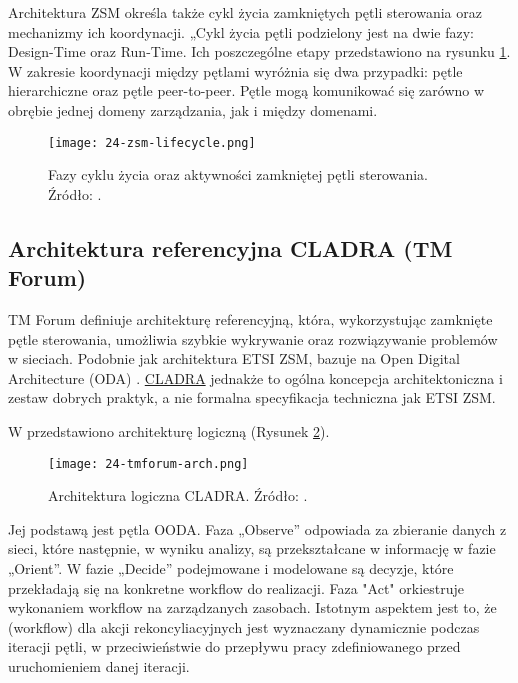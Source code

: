 Architektura ZSM określa także cykl życia zamkniętych pętli sterowania oraz mechanizmy ich koordynacji. „Cykl życia pętli podzielony jest na dwie fazy: Design-Time oraz Run-Time. Ich poszczególne etapy przedstawiono na rysunku \ref{fig:24-zsm-lifecycle}. W zakresie koordynacji między pętlami wyróżnia się dwa przypadki: pętle hierarchiczne oraz pętle peer-to-peer. Pętle mogą komunikować się zarówno w obrębie jednej domeny zarządzania, jak i między domenami.

\begin{figure}[!htbp]
    \centering \texttt{[image: 24-zsm-lifecycle.png]}
    \caption{Fazy cyklu życia oraz aktywności zamkniętej pętli sterowania. Źródło: \cite{etsizsm2019}.}\label{fig:24-zsm-lifecycle}
\end{figure}




\subsection{Architektura referencyjna CLADRA (TM Forum)}\hypertarget{sec:cladra}{}

TM Forum definiuje architekturę referencyjną, która, wykorzystując zamknięte pętle sterowania, umożliwia szybkie wykrywanie oraz rozwiązywanie problemów w sieciach. Podobnie jak architektura ETSI ZSM, bazuje na Open Digital Architecture (ODA) \cite{tmforum2018}. \hyperlink{def:cladra}{CLADRA} jednakże to ogólna koncepcja architektoniczna i zestaw dobrych praktyk, a nie formalna specyfikacja techniczna jak ETSI ZSM.

W \cite{tmforum2021} przedstawiono architekturę logiczną (Rysunek \ref{fig:24-tmforum-arch}).

\begin{figure}[!htbp]
    \centering \texttt{[image: 24-tmforum-arch.png]}
    \caption{Architektura logiczna CLADRA. Źródło: \cite{tmforum2021}.}\label{fig:24-tmforum-arch}
\end{figure}

Jej podstawą jest pętla OODA. Faza „Observe” odpowiada za zbieranie danych z sieci, które następnie, w wyniku analizy, są przekształcane w informację w fazie „Orient”. W fazie „Decide” podejmowane i modelowane są decyzje, które przekładają się na konkretne workflow do realizacji. Faza "Act" orkiestruje wykonaniem workflow na zarządzanych zasobach. Istotnym aspektem jest to, że (workflow) dla akcji rekoncyliacyjnych jest wyznaczany dynamicznie podczas iteracji pętli, w przeciwieństwie do przepływu pracy zdefiniowanego przed uruchomieniem danej iteracji. 

